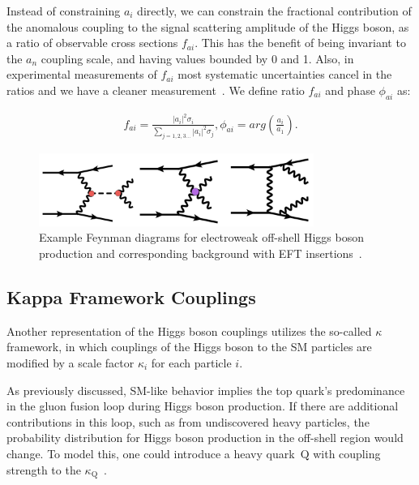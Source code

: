 Instead of constraining $a_i$ directly, we can constrain the fractional contribution of the anomalous coupling to the signal scattering amplitude of the Higgs boson, as a ratio of observable cross sections $f_{ai}$. This has the benefit of being invariant to the $a_n$ coupling scale, and having values bounded by 0 and 1. Also, in experimental measurements of $f_{ai}$ most systematic uncertainties cancel in the ratios and we have a cleaner measurement~\cite{2020}. We define ratio $f_{ai}$ and phase $\phi_{ai}$ as:

\begin{equation}
\label{eq:faiandphase}
\begin{gathered}
f_{ai} = \frac{|a_i|^2 \sigma_i}{\sum_{j=1,2,3...}|a_i|^2 \sigma_j},   \phi_{ai} = arg(\frac{a_i}{a_1}).
\end{gathered}
\end{equation}

\begin{figure}[!h]
\centering
\includegraphics[width=0.8\textwidth,clip] {figures/EFTdiagrams2.jpg}
\caption{Example Feynman diagrams for electroweak off-shell Higgs boson production and corresponding background with EFT insertions~\cite{offshellWGnote}.}
\label{fig:EFTdiagrams2}
\end{figure}

\subsection{Kappa Framework Couplings} \label{sec:kappa}

Another representation of the Higgs boson couplings utilizes the so-called $\kappa$ framework, in which couplings of 
the Higgs boson to the SM particles are modified by a scale factor $\kappa_i$ for each particle $i$.

As previously discussed, SM-like behavior implies the top quark's predominance in the gluon fusion loop during Higgs boson production. If there are additional contributions in this loop, such as from undiscovered heavy particles, the probability distribution for Higgs boson production in the off-shell region would change. To model this, one could introduce a heavy quark~$\mathrm{Q}$ with coupling strength to the \Hboson $\kappa_\mathrm{Q}$~\cite{Gritsan:2020pib,Davis:2021tiv}.

